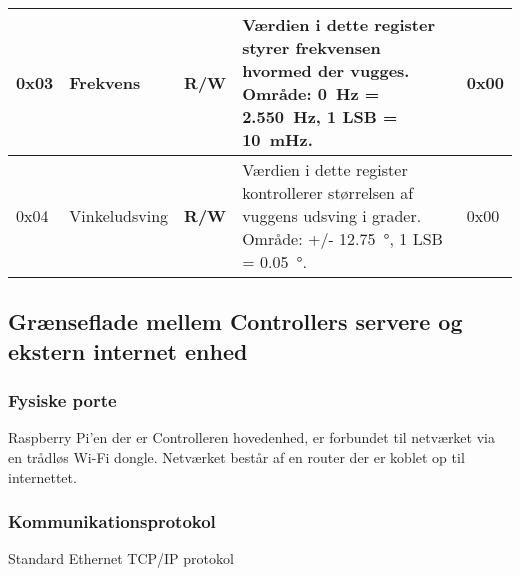 \begin{center}
\begin{table}[H]
\begin{tabular}{|p{1cm}|p{2.4cm}|p{1cm}|p{5.5cm}|p{2.5cm}|}
0x03 & Frekvens & \textbf{R/W} & Værdien i dette register styrer frekvensen hvormed der vugges. Område: \SI{0}{\hertz} = \SI{2.550}{\hertz},  1 LSB = \SI{10}{\milli\hertz}. & 0x00 \\ \hline

0x04 & Vinkeludsving & \textbf{R/W} & Værdien i dette register kontrollerer størrelsen af vuggens udsving i grader. Område: +/- \SI{12.75}{\degree}, 1 LSB = \SI{0.05}{\degree}. & 0x00 \\ \hline

\hline 
\end{tabular}
\end{table}
\end{center} 

\subsection{Grænseflade mellem Controllers servere og ekstern internet enhed}
\subsubsection*{Fysiske porte}

Raspberry Pi'en der er Controlleren hovedenhed, er forbundet til netværket via en trådløs Wi-Fi dongle. Netværket består af en router der er koblet op til internettet.

\subsubsection*{Kommunikationsprotokol}

Standard Ethernet TCP/IP protokol